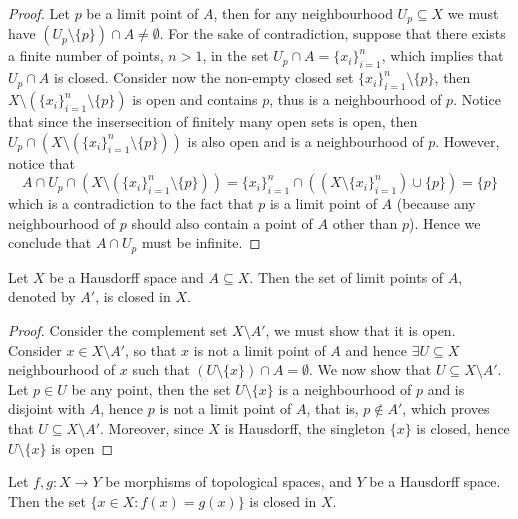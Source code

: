 \begin{proof}
  Let \(p\) be a limit point of \(A\), then for any neighbourhood \(U_p
  \subseteq X\) we must have \((U_p \setminus \{p\}) \cap A \neq \emptyset\).
  For the sake of contradiction, suppose that there exists a finite number of
  points, \(n > 1\), in the set \(U_p \cap A = \{x_i\}_{i=1}^n\), which implies
  that \(U_p \cap A\) is closed. Consider now the non-empty closed set
  \(\{x_i\}_{i=1}^n \setminus \{p\}\), then \(X \setminus (\{x_i\}_{i=1}^n
  \setminus \{p\})\) is open and contains \(p\), thus is a neighbourhood of
  \(p\). Notice that since the insersecition of finitely many open sets is open,
  then \(U_p \cap \left( X \setminus \left( \{x_i\}_{i=1}^n \setminus \{p\}
  \right) \right)\) is also open and is a neighbourhood of \(p\). However, notice
  that
  \[
    A \cap U_p \cap (X \setminus (\{x_i\}_{i=1}^n \setminus \{p\}))
    = \{x_i\}_{i=1}^n \cap ((X \setminus \{x_i\}_{i=1}^n) \cup \{p\})
    = \{p\}
  \]
  which is a contradiction to the fact that \(p\) is a limit point of \(A\)
  (because any neighbourhood of \(p\) should also contain a point of \(A\) other
  than \(p\)). Hence we conclude that \(A \cap U_p\) must be infinite.
\end{proof}

\begin{proposition}
  Let \(X\) be a Hausdorff space and \(A \subseteq X\). Then the set of limit
  points of \(A\), denoted by \(A'\), is closed in \(X\).
\end{proposition}

\begin{proof}
  Consider the complement set \(X \setminus A'\), we must show that it is open.
  Consider \(x \in X \setminus A'\), so that \(x\) is not a limit point of \(A\)
  and hence \(\exists U \subseteq X\) neighbourhood of \(x\) such that \((U
  \setminus \{x\}) \cap A = \emptyset\). We now show that \(U \subseteq X
  \setminus A'\). Let \(p \in U\) be any point, then the set \(U \setminus
  \{x\}\) is a neighbourhood of \(p\) and is disjoint with \(A\), hence \(p\) is
  not a limit point of \(A\), that is, \(p \not\in A'\), which proves that \(U
  \subseteq X \setminus A'\). Moreover, since \(X\) is Hausdorff, the singleton
  \(\{x\}\) is closed, hence \(U \setminus \{x\}\) is open
\end{proof}

\begin{proposition}
  Let \(f,g : X \to Y\) be morphisms of topological spaces, and \(Y\) be a
  Hausdorff space. Then the set \(\{x \in X : f(x) = g(x)\}\) is closed in
  \(X\).
\end{proposition}

